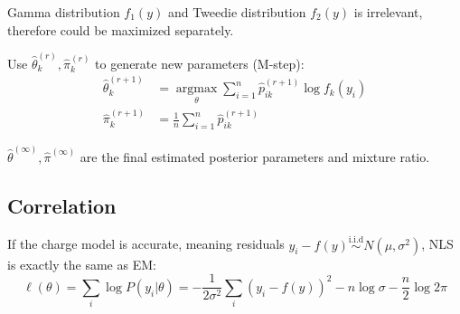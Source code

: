 \begin{survey}
Gamma distribution $f_{1}(y)$ and Tweedie distribution $f_{2}(y)$ is irrelevant, therefore could be maximized separately.

Use $\hat{\theta}_{k}^{(r)},\hat{\pi}_{k}^{(r)}$ to generate new parameters (M-step):
\begin{equation}
    \begin{aligned}
        \hat{\theta}_{k}^{(r+1)}&=\operatorname*{argmax}_{\theta} \sum_{i=1}^{n}\hat{p}_{ik}^{(r+1)}\log f_{k}(y_{i})\\
        \hat{\pi}_{k}^{(r+1)}&=\frac1n\sum_{i=1}^n\hat{p}_{ik}^{(r+1)}
    \end{aligned}
\end{equation}

$\hat{\theta}^{(\infty)}, \hat{\pi}^{(\infty)}$ 
are the final estimated posterior parameters and mixture ratio.

\subsection{Correlation}
If the charge model is accurate, meaning residuals $y_{i}-f(y)\stackrel{\text{i.i.d}}{\sim}N(\mu, \sigma^{2})$,
NLS is exactly the same as EM:
\begin{equation}
\ell(\theta)=\sum_i\log P(y_i|\theta)=-\frac{1}{2\sigma^{2}}\sum_{i}(y_{i}-f(y))^{2}
-n\log\sigma-\frac{n}{2}\log2\pi
\end{equation}


% 

\printbibliography

\end{survey}
